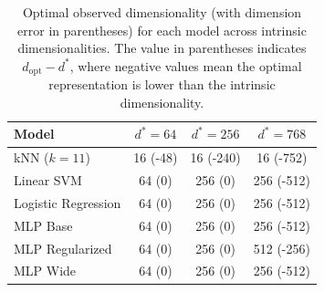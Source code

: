 \begin{table}[h]
\centering
\begin{tabular}{lccc}
\toprule
\textbf{Model} & \textbf{$d^*=64$} & \textbf{$d^*=256$} & \textbf{$d^*=768$} \\
\midrule
kNN ($k=11$) & 16 (-48) & 16 (-240) & 16 (-752) \\
Linear SVM & 64 (0) & 256 (0) & 256 (-512) \\
Logistic Regression & 64 (0) & 256 (0) & 256 (-512) \\
MLP Base & 64 (0) & 256 (0) & 256 (-512) \\
MLP Regularized & 64 (0) & 256 (0) & 512 (-256) \\
MLP Wide & 64 (0) & 256 (0) & 256 (-512) \\
\bottomrule
\end{tabular}
\caption{Optimal observed dimensionality (with dimension error in parentheses) for each model across intrinsic dimensionalities. The value in parentheses indicates $d_{\mathrm{opt}} - d^*$, where negative values mean the optimal representation is lower than the intrinsic dimensionality.}
\label{tab:optimal_dimension_combined}
\end{table}
